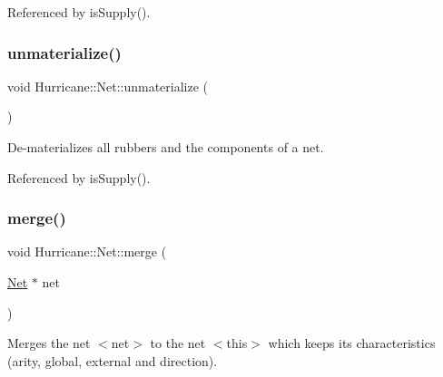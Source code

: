 Referenced by is\+Supply().

\mbox{\label{classHurricane_1_1Net_a9e53a3d54b61f7081263e6d7b4fa81b9}} 
\subsubsection{\texorpdfstring{unmaterialize()}{unmaterialize()}}
{\footnotesize\ttfamily void Hurricane\+::\+Net\+::unmaterialize (\begin{DoxyParamCaption}{ }\end{DoxyParamCaption})}

De-\/materializes all rubbers and the components of a net. 

Referenced by is\+Supply().

\mbox{\label{classHurricane_1_1Net_a442f62d23364805f39816cd543284886}} 
\subsubsection{\texorpdfstring{merge()}{merge()}}
{\footnotesize\ttfamily void Hurricane\+::\+Net\+::merge (\begin{DoxyParamCaption}\item[{\hyperlink{classHurricane_1_1Net}{Net} $\ast$}]{net }\end{DoxyParamCaption})}

Merges the net {\ttfamily $<$net$>$} to the net {\ttfamily $<$this$>$} which keeps its characteristics (arity, global, external and direction).

